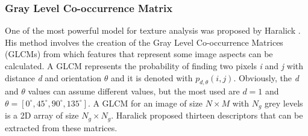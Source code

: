 \documentclass[final,a4paper,12pt,english]{UnicaPhdThesis3}
\begin{document}
	\subsubsection{Gray Level Co-occurrence Matrix} \label{GLCM}
	One of the most powerful model for texture analysis was proposed by Haralick \cite{Haralick}. His method involves the creation of the Gray Level Co-occurrence Matrices (\acs{GLCM}s) from which features that represent some image aspects can be calculated. A GLCM represents the probability of finding two pixels \textit{i} and \textit{j} with distance \textit{d} and orientation $\theta$ and it is denoted with $p_{d,\theta}(i,j)$. Obviously, the \textit{d} and $\theta$ values can assume different values, but the most used are $d = 1$ and $\theta = [0 ^\circ, 45 ^\circ, 90 ^\circ, 135 ^\circ]$. A GLCM for an image of size $N \times M$ with $N_{g}$ grey levels is a 2D array of size $N_{g} \times N_{g}$. Haralick proposed thirteen descriptors that can be extracted from these matrices. 
	
\end{document}
